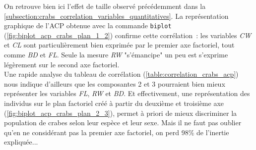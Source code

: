 \documentclass[a4paper,10pt]{report}
\begin{document}
On retrouve bien ici l'effet de taille observé précédemment dans la  \autoref{subsection:crabs_correlation_variables_quantitatives}. La représentation graphique de l'ACP obtenue avec la commande \texttt{biplot} (\autoref{fig:biplot_acp_crabs_plan_1_2}) confirme cette corrélation~: les variables \textit{CW} et \textit{CL} sont particulièrement bien exprimée par le premier axe factoriel, tout comme \textit{BD} et \textit{FL}. Seule la mesure \textit{RW} "s'émancipe" un peu est s'exprime légèrement sur le second axe factoriel.\\
Une rapide analyse du tableau de corrélation (\autoref{table:correlation_crabs_acp}) nous indique d'ailleurs que les composantes 2 et 3 pourraient bien mieux représenter les variables \textit{FL}, \textit{RW} et \textit{BD}. Et effectivement, une représentation des individus sur le plan factoriel créé à partir du deuxième et troisième axe (\autoref{fig:biplot_acp_crabs_plan_2_3}), permet à priori de mieux discriminer la population de crabes selon leur espèce et leur sexe. Mais il ne faut pas oublier qu'en ne considérant pas la premier axe factoriel, on perd 98\% de l'inertie expliquée...
\end{document}
